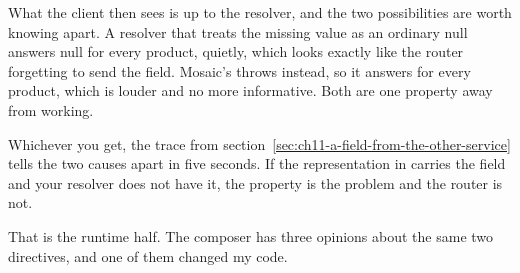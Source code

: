 What the client then sees is up to the resolver, and the two possibilities are
worth knowing apart. A resolver that treats the missing value as an ordinary
null answers null for every product, quietly, which looks exactly like the
router forgetting to send the field. Mosaic's throws instead, so it answers
 for every product, which is louder and no
more informative. Both are one property away from working.

Whichever you get, the trace from
section~\ref{sec:ch11-a-field-from-the-other-service} tells the two causes
apart in five seconds. If the representation in  carries
the field and your resolver does not have it, the property is the problem and
the router is not.

\medskip
That is the runtime half. The composer has three opinions about the same two
directives, and one of them changed my code.

%
